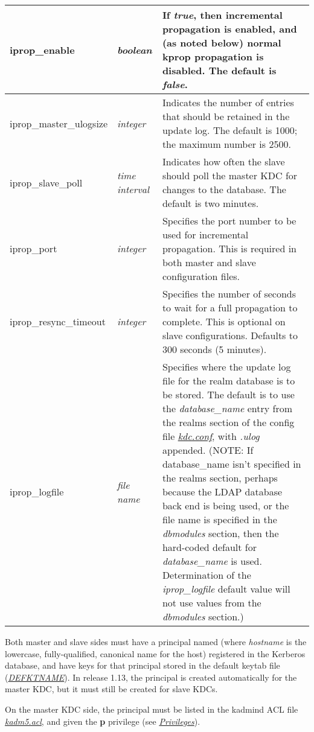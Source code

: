 \documentclass[letterpaper,10pt,english]{sphinxmanual}
\begin{document}
\begin{tabulary}{\linewidth}{|L|L|L|}
\hline

iprop\_enable
 & 
\emph{boolean}
 & 
If \emph{true}, then incremental propagation is enabled, and (as noted below) normal kprop propagation is disabled. The default is \emph{false}.
\\
\hline
iprop\_master\_ulogsize
 & 
\emph{integer}
 & 
Indicates the number of entries that should be retained in the update log. The default is 1000; the maximum number is 2500.
\\
\hline
iprop\_slave\_poll
 & 
\emph{time interval}
 & 
Indicates how often the slave should poll the master KDC for changes to the database. The default is two minutes.
\\
\hline
iprop\_port
 & 
\emph{integer}
 & 
Specifies the port number to be used for incremental propagation. This is required in both master and slave configuration files.
\\
\hline
iprop\_resync\_timeout
 & 
\emph{integer}
 & 
Specifies the number of seconds to wait for a full propagation to complete. This is optional on slave configurations.  Defaults to 300 seconds (5 minutes).
\\
\hline
iprop\_logfile
 & 
\emph{file name}
 & 
Specifies where the update log file for the realm database is to be stored. The default is to use the \emph{database\_name} entry from the realms section of the config file {\hyperref[admin/conf_files/kdc_conf:kdc-conf-5]{\emph{kdc.conf}}}, with \emph{.ulog} appended. (NOTE: If database\_name isn't specified in the realms section, perhaps because the LDAP database back end is being used, or the file name is specified in the \emph{dbmodules} section, then the hard-coded default for \emph{database\_name} is used. Determination of the \emph{iprop\_logfile}  default value will not use values from the \emph{dbmodules} section.)
\\
\hline\end{tabulary}


Both master and slave sides must have a principal named
 (where \emph{hostname} is the lowercase,
fully-qualified, canonical name for the host) registered in the
Kerberos database, and have keys for that principal stored in the
default keytab file ({\hyperref[mitK5defaults:paths]{\emph{DEFKTNAME}}}).  In release 1.13, the
 principal is created automatically for the master
KDC, but it must still be created for slave KDCs.

On the master KDC side, the  principal must be
listed in the kadmind ACL file {\hyperref[admin/conf_files/kadm5_acl:kadm5-acl-5]{\emph{kadm5.acl}}}, and given the
\textbf{p} privilege (see {\hyperref[admin/database:privileges]{\emph{Privileges}}}).
\end{document}

